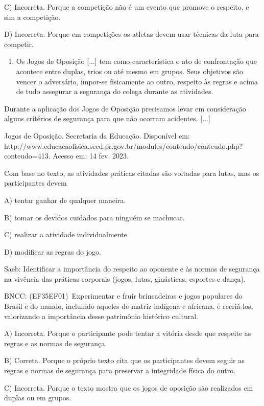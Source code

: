 C) Incorreta. Porque a competição não é um evento que promove o
respeito, e sim a competição.

D) Incorreta. Porque em competições os atletas devem usar técnicas da
luta para competir.

\begin{enumerate}
\def\labelenumi{\arabic{enumi}.}
\item
  Os Jogos de Oposição {[}...{]} tem como característica o ato de
  confrontação que acontece entre duplas, trios ou até mesmo em grupos.
  Seus objetivos são vencer o adversário, impor-se fisicamente ao outro,
  respeito às regras e acima de tudo assegurar a segurança do colega
  durante as atividades.
\end{enumerate}

Durante a aplicação dos Jogos de Oposição precisamos levar em
consideração alguns critérios de segurança para que não ocorram
acidentes. {[}...{]}

Jogos de Oposição. Secretaria da Educação. Disponível em:
http://www.educacaofisica.seed.pr.gov.br/modules/conteudo/conteudo.php?conteudo=413.
Acesso em: 14 fev. 2023.

Com base no texto, as atividades práticas citadas são voltadas para
lutas, mas os participantes devem

A) tentar ganhar de qualquer maneira.

B) tomar os devidos cuidados para ninguém se machucar.

C) realizar a atividade individualmente.

D) modificar as regras do jogo.

Saeb: Identificar a importância do respeito ao oponente e às normas de
segurança na vivência das práticas corporais (jogos, lutas, ginásticas,
esportes e dança).

BNCC: (EF35EF01)~Experimentar e fruir brincadeiras e jogos populares do
Brasil e do mundo, incluindo aqueles de matriz indígena e africana, e
recriá-los, valorizando a importância desse patrimônio histórico
cultural.

A) Incorreta. Porque o participante pode tentar a vitória desde que
respeite as regras e as normas de segurança.

B) Correta. Porque o próprio texto cita que os participantes devem
seguir as regras e normas de segurança para preservar a integridade
física do outro.

C) Incorreta. Porque o texto mostra que os jogos de oposição são
realizados em duplas ou em grupos.

